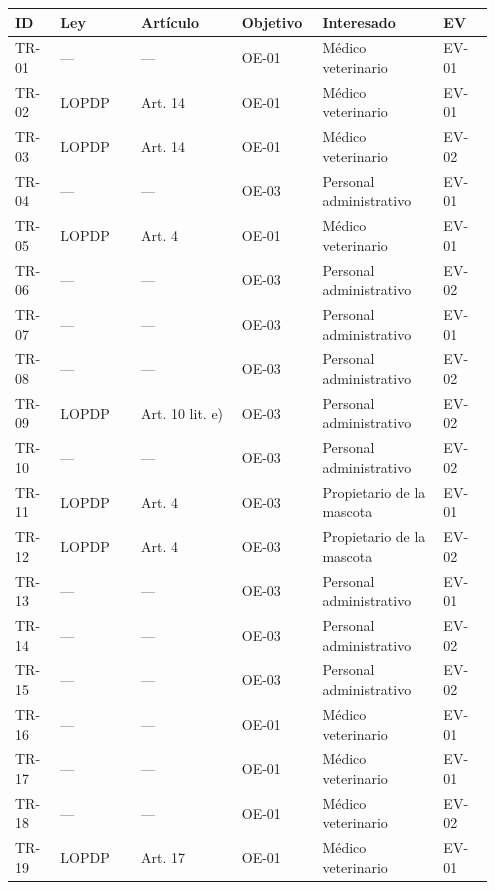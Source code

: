 \documentclass[
]{article}
\newcounter{none} %
\begin{document}
{\footnotesize
\def\LTcaptype{none}
\begin{longtable}[]{|
  >{\raggedright\arraybackslash}p{0.09\linewidth}|
  >{\raggedright\arraybackslash}p{0.16\linewidth}|
  >{\raggedright\arraybackslash}p{0.20\linewidth}|
  >{\raggedright\arraybackslash}p{0.16\linewidth}|
  >{\raggedright\arraybackslash}p{0.24\linewidth}|
  >{\raggedright\arraybackslash}p{0.10\linewidth}|}
\hline
\textbf{ID} & \textbf{Ley} & \textbf{Artículo} & \textbf{Objetivo} & \textbf{Interesado} & \textbf{EV} \\
\hline
\endhead
\hline
\endlastfoot
TR-01 & — & — & OE-01 & Médico veterinario & EV-01 \\
\hline
TR-02 & LOPDP & Art. 14 & OE-01 & Médico veterinario & EV-01 \\
\hline
TR-03 & LOPDP & Art. 14 & OE-01 & Médico veterinario & EV-02 \\
\hline
TR-04 & — & — & OE-03 & Personal administrativo & EV-01 \\
\hline
TR-05 & LOPDP & Art. 4 & OE-01 & Médico veterinario & EV-01 \\
\hline
TR-06 & — & — & OE-03 & Personal administrativo & EV-02 \\
\hline
TR-07 & — & — & OE-03 & Personal administrativo & EV-01 \\
\hline
TR-08 & — & — & OE-03 & Personal administrativo & EV-02 \\
\hline
TR-09 & LOPDP & Art. 10 lit. e) & OE-03 & Personal administrativo & EV-02 \\
\hline
TR-10 & — & — & OE-03 & Personal administrativo & EV-02 \\
\hline
TR-11 & LOPDP & Art. 4 & OE-03 & Propietario de la mascota & EV-01 \\
\hline
TR-12 & LOPDP & Art. 4 & OE-03 & Propietario de la mascota & EV-02 \\
\hline
TR-13 & — & — & OE-03 & Personal administrativo & EV-01 \\
\hline
TR-14 & — & — & OE-03 & Personal administrativo & EV-02 \\
\hline
TR-15 & — & — & OE-03 & Personal administrativo & EV-02 \\
\hline
TR-16 & — & — & OE-01 & Médico veterinario & EV-01 \\
\hline
TR-17 & — & — & OE-01 & Médico veterinario & EV-01 \\
\hline
TR-18 & — & — & OE-01 & Médico veterinario & EV-02 \\
\hline
TR-19 & LOPDP & Art. 17 & OE-01 & Médico veterinario & EV-01 \\

\end{longtable}}
\end{document}
